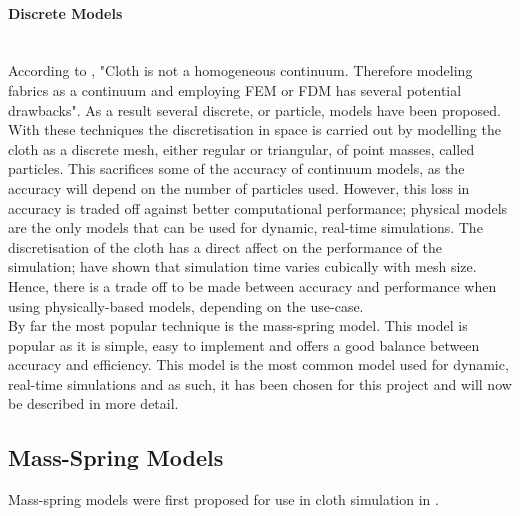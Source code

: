 \paragraph{Discrete Models}\leavevmode\\
According to \textcite[2]{Choi2002}, "Cloth is not a homogeneous continuum. Therefore modeling fabrics as a continuum and employing FEM or FDM has several potential drawbacks". As a result several discrete, or particle, models have been proposed.
\\With these techniques the discretisation in space is carried out by modelling the cloth as a discrete mesh, either regular or triangular, of point masses, called particles. This sacrifices some of the accuracy of continuum models, as the accuracy will depend on the number of particles used. However, this loss in accuracy is traded off against better computational performance; physical models are the only models that can be used for dynamic, real-time simulations. The discretisation of the cloth has a direct affect on the performance of the simulation; \textcite[5]{Volino2001} have shown that simulation time varies cubically with mesh size. Hence, there is a trade off to be made between accuracy and performance when using physically-based models, depending on the use-case.
\\By far the most popular technique is the mass-spring model. This model is popular as it is simple, easy to implement and offers a good balance between accuracy and efficiency. This model is the most common model used for dynamic, real-time simulations and as such, it has been chosen for this project and will now be described in more detail.

\subsection{Mass-Spring Models}
Mass-spring models were first proposed for use in cloth simulation in \textcite{Provot2001}.



